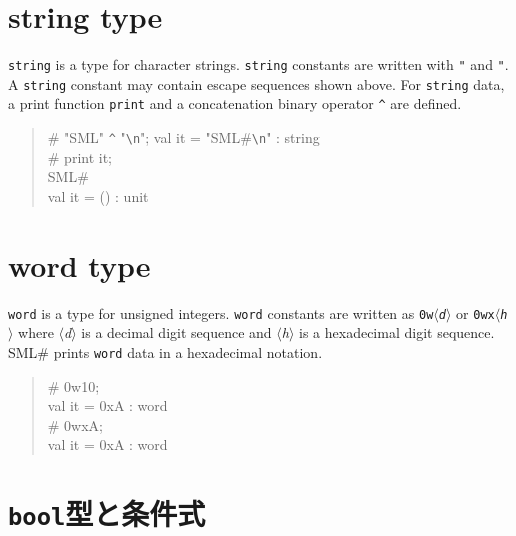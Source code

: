 \documentclass{jbook}
\newcommand{\txt}[2]{#1}
\newcommand{\smlsharp}{SML\#}
\newcommand{\nonterm}[1]{\mbox{$\langle$}{\it #1}\mbox{$\rangle$}}
\newenvironment{program}{\begin{quote}\begin{tt}}%
                        {\end{tt}\end{quote}}
\begin{document}
\section{string type}
	{\tt string} is a type for character strings.
	{\tt string} constants are written with {\tt "} and {\tt "}.
	A {\tt string} constant may contain escape sequences shown
above.
	For {\tt string} data, a print function {\tt print} and a
concatenation binary operator {\tt \verb|^|} are defined.
\begin{program}
\# "SML" \verb|^| "\verb|\n|";
val it = "SML\#\verb|\n|" : string\\
\# print it;\\
SML\#\\
val it = () : unit
\end{program}

\section{word type}
	{\tt word} is a type for unsigned integers.
	{\tt word} constants are written as {\tt 0w\nonterm{d}} or
{\tt 0wx\nonterm{h}} where \nonterm{d} is a decimal digit sequence and
\nonterm{h} is a hexadecimal digit sequence.
	\smlsharp{} prints {\tt word} data in a hexadecimal notation.
\begin{program}
\# 0w10;\\
val it = 0xA : word\\
\# 0wxA;\\
val it = 0xA : word
\end{program}
\fi%

\section{
\txt{{\tt bool}型と条件式}
{Type {\tt bool} and conditional expressions}
}
\label{sec:tutorialConditional}
\end{document}
